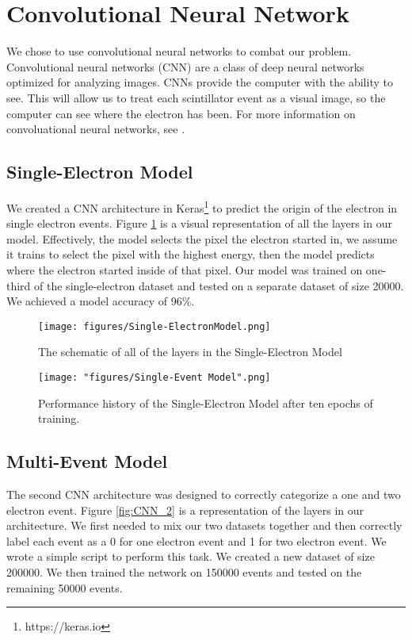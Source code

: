 \documentclass[12pt]{article}
\begin{document}
\section{Convolutional Neural Network}
We chose to use convolutional neural networks to combat our problem. Convolutional neural networks (CNN) are a class of deep neural networks optimized for analyzing images. CNNs provide the computer with the ability to see. This will allow us to treat each scintillator event as a visual image, so the computer can see where the electron has been. For more information on convoluational neural networks, see \cite{mehta}. 
\subsection{Single-Electron Model}
We created a CNN architecture in Keras\footnote{https://keras.io} to predict the origin of the electron in single electron events. Figure \ref{fig:single-model} is a visual representation of all the layers in our model. Effectively, the model selects the pixel the electron started in, we assume it trains to select the pixel with the highest energy, then the model predicts where the electron started inside of that pixel. Our model was trained on one-third of the single-electron dataset and tested on a separate dataset of size 20000. We achieved a model accuracy of 96\%. 
\begin{figure}[H]
    \centering
    \texttt{[image: figures/Single-ElectronModel.png]}
    \caption{The schematic of all of the layers in the Single-Electron Model}
    \label{fig:single-model}
\end{figure}

\begin{figure}
    \centering
    \texttt{[image: "figures/Single-Event Model".png]}
    \caption{Performance history of the Single-Electron Model after ten epochs of training.}
    \label{fig:single-electron-model}
\end{figure}

\subsection{Multi-Event Model}
The second CNN architecture was designed to correctly categorize a one and two electron event. Figure \ref{fig:CNN_2} is a representation of the layers in our architecture. We first needed to mix our two datasets together and then correctly label each event as a 0 for one electron event and 1 for two electron event. We wrote a simple script to perform this task. We created a new dataset of size 200000. We then trained the network on 150000 events and tested on the remaining 50000 events. 
\end{document}
